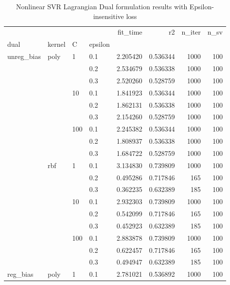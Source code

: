 \begin{table}[H]
\centering
\caption{Nonlinear SVR Lagrangian Dual formulation results with Epsilon-insensitive loss}
\label{nonlinear_lagrangian_dual_svr_cv_results}
\begin{tabular}{llllrrrr}
\toprule
         &     &     &     &  fit\_time &        r2 &  n\_iter &  n\_sv \\
dual & kernel & C & epsilon &           &           &         &       \\
\midrule
unreg\_bias & poly & 1   & 0.1 &  2.205420 &  0.536344 &    1000 &   100 \\
         &     &     & 0.2 &  2.534679 &  0.536338 &    1000 &   100 \\
         &     &     & 0.3 &  2.520260 &  0.528759 &    1000 &   100 \\
         &     & 10  & 0.1 &  1.841923 &  0.536344 &    1000 &   100 \\
         &     &     & 0.2 &  1.862131 &  0.536338 &    1000 &   100 \\
         &     &     & 0.3 &  2.154260 &  0.528759 &    1000 &   100 \\
         &     & 100 & 0.1 &  2.245382 &  0.536344 &    1000 &   100 \\
         &     &     & 0.2 &  1.808937 &  0.536338 &    1000 &   100 \\
         &     &     & 0.3 &  1.684722 &  0.528759 &    1000 &   100 \\
         & rbf & 1   & 0.1 &  3.134830 &  0.739809 &    1000 &   100 \\
         &     &     & 0.2 &  0.495286 &  0.717846 &     165 &   100 \\
         &     &     & 0.3 &  0.362235 &  0.632389 &     185 &   100 \\
         &     & 10  & 0.1 &  2.932303 &  0.739809 &    1000 &   100 \\
         &     &     & 0.2 &  0.542099 &  0.717846 &     165 &   100 \\
         &     &     & 0.3 &  0.452923 &  0.632389 &     185 &   100 \\
         &     & 100 & 0.1 &  2.883878 &  0.739809 &    1000 &   100 \\
         &     &     & 0.2 &  0.622457 &  0.717846 &     165 &   100 \\
         &     &     & 0.3 &  0.494947 &  0.632389 &     185 &   100 \\
reg\_bias & poly & 1   & 0.1 &  2.781021 &  0.536892 &    1000 &   100 \\

\end{tabular}
\end{table}
